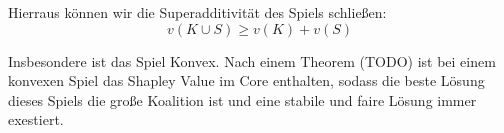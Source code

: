 \documentclass[12pt]{article}
\theoremstyle{break}
\begin{document}
Hierraus können wir die Superadditivität des Spiels schließen:
\begin{equation}
  v(K\cup S) \geq v(K) + v(S)
\end{equation}


Insbesondere ist das Spiel Konvex.
Nach einem Theorem (TODO) ist bei einem konvexen Spiel das Shapley Value im Core enthalten, sodass die beste Lösung dieses Spiels die große Koalition ist und eine stabile und faire Lösung immer exestiert.





%
%
%

\end{document}
